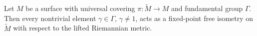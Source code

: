 Let $M$ be a surface with universal covering $\pi: \tilde{M} \to M$ and fundamental group $\Gamma$. Then every nontrivial element $\gamma \in \Gamma$, $\gamma \neq 1$, acts as a fixed-point free isometry on $\tilde{M}$ with respect to the lifted Riemannian metric.
